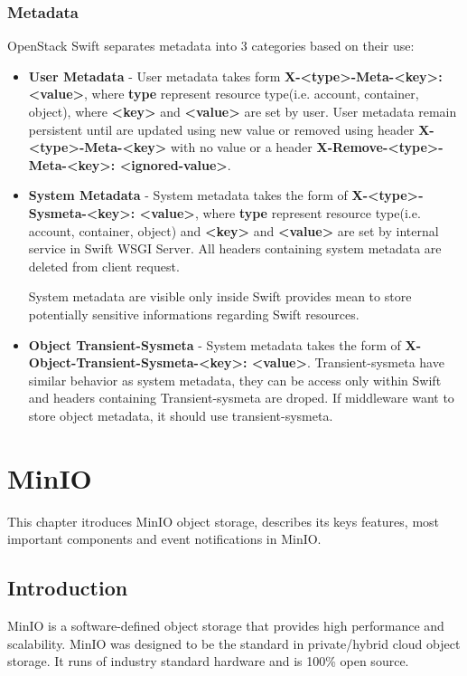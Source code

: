     \subsection{Metadata}
    OpenStack Swift separates metadata into 3 categories based on their use:
    \begin{itemize}
        \item \textbf{User Metadata} - User metadata takes form \textbf{X-<type>-Meta-<key>: <value>}, where \textbf{type} represent resource type(i.e. account, container, object), where \textbf{<key>} and \textbf{<value>} are set by user. User metadata remain persistent until are updated using new value or removed using header  \textbf{X-<type>-Meta-<key>} with no value or a header \textbf{X-Remove-<type>-Meta-<key>: <ignored-value>}.
        \item \textbf{System Metadata} - System metadata takes the form of \textbf{X-<type>-Sysmeta-<key>: <value>}, where \textbf{type} represent resource type(i.e. account, container, object) and \textbf{<key>} and \textbf{<value>} are set by internal service in Swift WSGI Server.
        All headers containing system metadata are deleted from client request.

        System metadata are visible only inside Swift provides mean to store potentially sensitive informations regarding Swift resources.
        \item \textbf{Object Transient-Sysmeta} - System metadata takes the form of \textbf{X-Object-Transient-Sysmeta-<key>: <value>}. Transient-sysmeta have similar behavior as system metadata, they can be access only within Swift and headers containing Transient-sysmeta are droped. If middleware want to store object metadata, it should use transient-sysmeta\cite{swiftMiddleware}.
    \end{itemize}


\chapter{MinIO}
    This chapter itroduces MinIO object storage, describes its keys features, most important components and event notifications in MinIO.

\section{Introduction}
    MinIO is a software-defined object storage that provides high performance and scalability. MinIO was designed to be the standard in private/hybrid cloud object storage.
    It runs of industry standard hardware and is 100\% open source\cite{minioObjectStorage}.

